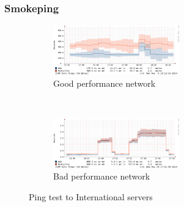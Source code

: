 \begin{frame}
	\frametitle{Smokeping}
	\begin{figure} 
		\begin{subfigure}{\textwidth} 
			\centering 
			\includegraphics[width=0.6\textwidth]{img/smoke_int_good}
			\caption[Smokeping: Ping test to International Servers with good performance]{Good performance network}
		\end{subfigure}%
		\\ 
		\begin{subfigure}{\textwidth} 
			\centering 
			\includegraphics[width=0.6\textwidth]{img/smoke_int_bad}
			\caption[Smokeping: Ping test to International servers with bad performance]{Bad performance network}
		\end{subfigure}
		\caption[Smokeping: Ping test to International servers]{Ping test to International servers}
	\end{figure} 
\end{frame}


